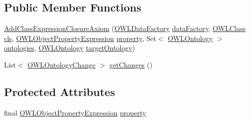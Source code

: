 \subsection*{Public Member Functions}
\begin{DoxyCompactItemize}
\item 
\hyperlink{classorg_1_1semanticweb_1_1owlapi_1_1_add_class_expression_closure_axiom_ab123d120c1624d48dbbe4fefdfca11a2}{Add\-Class\-Expression\-Closure\-Axiom} (\hyperlink{interfaceorg_1_1semanticweb_1_1owlapi_1_1model_1_1_o_w_l_data_factory}{O\-W\-L\-Data\-Factory} \hyperlink{classorg_1_1semanticweb_1_1owlapi_1_1_abstract_composite_ontology_change_aebcfd0601543ebb5f72b1fe53a5352c9}{data\-Factory}, \hyperlink{interfaceorg_1_1semanticweb_1_1owlapi_1_1model_1_1_o_w_l_class}{O\-W\-L\-Class} \hyperlink{classorg_1_1semanticweb_1_1owlapi_1_1_add_class_expression_closure_axiom_a5cec1d39c2c4f63bcb62a259e9b03163}{cls}, \hyperlink{interfaceorg_1_1semanticweb_1_1owlapi_1_1model_1_1_o_w_l_object_property_expression}{O\-W\-L\-Object\-Property\-Expression} \hyperlink{classorg_1_1semanticweb_1_1owlapi_1_1_add_class_expression_closure_axiom_aef1be2bdc5dd0f1a365ebbe9814745d4}{property}, Set$<$ \hyperlink{interfaceorg_1_1semanticweb_1_1owlapi_1_1model_1_1_o_w_l_ontology}{O\-W\-L\-Ontology} $>$ \hyperlink{classorg_1_1semanticweb_1_1owlapi_1_1_add_class_expression_closure_axiom_ab96f29d5961bedbb82a9255de0c01b5e}{ontologies}, \hyperlink{interfaceorg_1_1semanticweb_1_1owlapi_1_1model_1_1_o_w_l_ontology}{O\-W\-L\-Ontology} \hyperlink{classorg_1_1semanticweb_1_1owlapi_1_1_add_class_expression_closure_axiom_a1b4cd911a872415e0a76a25714595470}{target\-Ontology})
\item 
List$<$ \hyperlink{classorg_1_1semanticweb_1_1owlapi_1_1model_1_1_o_w_l_ontology_change}{O\-W\-L\-Ontology\-Change} $>$ \hyperlink{classorg_1_1semanticweb_1_1owlapi_1_1_add_class_expression_closure_axiom_a2a4996e325158effda63902111d88846}{get\-Changes} ()
\end{DoxyCompactItemize}
\subsection*{Protected Attributes}
\begin{DoxyCompactItemize}
\item 
final \hyperlink{interfaceorg_1_1semanticweb_1_1owlapi_1_1model_1_1_o_w_l_object_property_expression}{O\-W\-L\-Object\-Property\-Expression} \hyperlink{classorg_1_1semanticweb_1_1owlapi_1_1_add_class_expression_closure_axiom_aef1be2bdc5dd0f1a365ebbe9814745d4}{property}
\end{DoxyCompactItemize}
